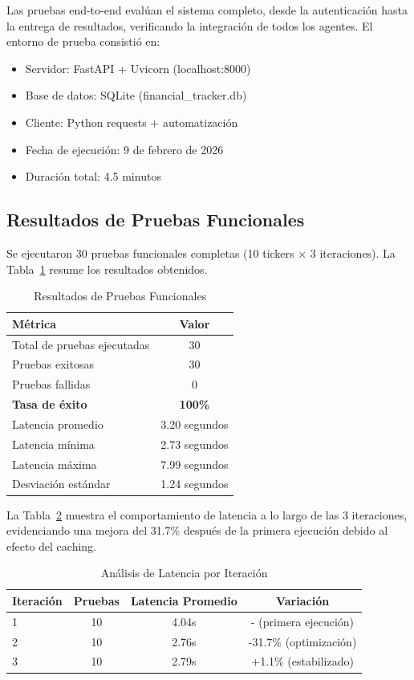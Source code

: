 Las pruebas end-to-end evalúan el sistema completo, desde la autenticación hasta la entrega de resultados, verificando la integración de todos los agentes. El entorno de prueba consistió en:

\begin{itemize}
    \item Servidor: FastAPI + Uvicorn (localhost:8000)
    \item Base de datos: SQLite (financial\_tracker.db)
    \item Cliente: Python requests + automatización
    \item Fecha de ejecución: 9 de febrero de 2026
    \item Duración total: 4.5 minutos
\end{itemize}

\subsection{Resultados de Pruebas Funcionales}

Se ejecutaron 30 pruebas funcionales completas (10 tickers × 3 iteraciones). La Tabla~\ref{tab:pruebas_funcionales} resume los resultados obtenidos.

\begin{table}[htbp]
\centering
\caption{Resultados de Pruebas Funcionales}
\label{tab:pruebas_funcionales}
\begin{tabular}{lc}
\hline
\textbf{Métrica} & \textbf{Valor} \\
\hline
Total de pruebas ejecutadas & 30 \\
Pruebas exitosas & 30 \\
Pruebas fallidas & 0 \\
\textbf{Tasa de éxito} & \textbf{100\%} \\
Latencia promedio & 3.20 segundos \\
Latencia mínima & 2.73 segundos \\
Latencia máxima & 7.99 segundos \\
Desviación estándar & 1.24 segundos \\
\hline
\end{tabular}
\end{table}

La Tabla~\ref{tab:iteraciones} muestra el comportamiento de latencia a lo largo de las 3 iteraciones, evidenciando una mejora del 31.7\% después de la primera ejecución debido al efecto del caching.

\begin{table}[htbp]
\centering
\caption{Análisis de Latencia por Iteración}
\label{tab:iteraciones}
\begin{tabular}{lccc}
\hline
\textbf{Iteración} & \textbf{Pruebas} & \textbf{Latencia Promedio} & \textbf{Variación} \\
\hline
1 & 10 & 4.04s & - (primera ejecución) \\
2 & 10 & 2.76s & -31.7\% (optimización) \\
3 & 10 & 2.79s & +1.1\% (estabilizado) \\
\hline
\end{tabular}
\end{table}

